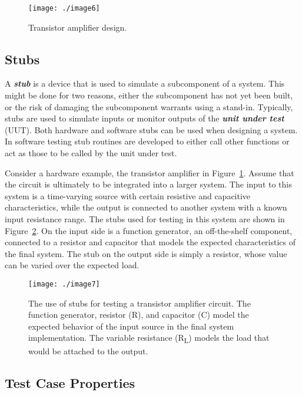 \begin{figure}
\texttt{[image: ./image6]}
\caption{Transistor amplifier design.}
\label{figure:transAmpDesign}
\end{figure}

\subsection{Stubs}
\label{subsection:stubs}

A \emph{\textbf{stub}} is a device that is used to simulate a
subcomponent of a system. This might be done for two reasons, either the
subcomponent has not yet been built, or the risk of damaging the
subcomponent warrants using a stand-in. Typically, stubs are used to
simulate inputs or monitor outputs of the \emph{\textbf{unit under
test}} (UUT). Both hardware and software stubs can be used when
designing a system. In software testing stub routines are developed to
either call other functions or act as those to be called by the unit
under test.

Consider a hardware example, the transistor amplifier in 
Figure~\ref{figure:transAmpDesign}.
Assume that the circuit is ultimately to be integrated into a larger
system. The input to this system is a time-varying source with certain
resistive and capacitive characteristics, while the output is connected
to another system with a known input resistance range. The stubs used
for testing in this system are shown in Figure~\ref{figure:usingStubs}. 
On the input side is
a function generator, an off-the-shelf component, connected to a
resistor and capacitor that models the expected characteristics of the
final system. The stub on the output side is simply a resistor, whose
value can be varied over the expected load.

\begin{figure}
\texttt{[image: ./image7]}
\caption{The use of stubs for testing a transistor amplifier
circuit. The function generator, resistor (R), and capacitor (C) model
the expected behavior of the input source in the final system
implementation. The variable resistance (R\textsubscript{L}) models the
load that would be attached to the output.}
\label{figure:usingStubs}
\end{figure}


\subsection{Test Case Properties}
\label{subsection:test-case-properties}

